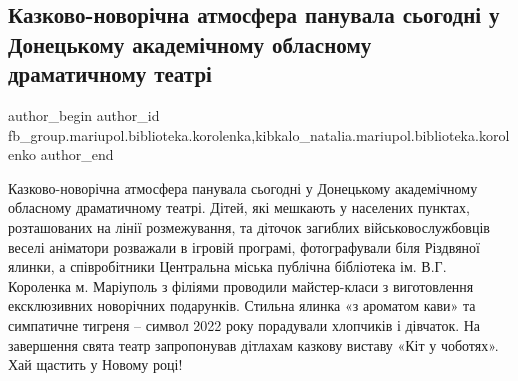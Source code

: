  
 
 
 
 

\subsection{Казково-новорічна атмосфера панувала сьогодні у Донецькому академічному обласному драматичному театрі}
\label{sec:23_12_2021.fb.fb_group.mariupol.biblioteka.korolenka.1.kazkovo_novor_chna_a}
 
\ifcmt
 author_begin
   author_id fb_group.mariupol.biblioteka.korolenka,kibkalo_natalia.mariupol.biblioteka.korolenko
 author_end
\fi

Казково-новорічна атмосфера панувала сьогодні у Донецькому академічному
обласному драматичному театрі.  Дітей, які мешкають у населених пунктах,
розташованих на лінії розмежування, та діточок загиблих військовослужбовців
веселі аніматори розважали в ігровій програмі, фотографували біля Різдвяної
ялинки, а співробітники Центральна міська публічна бібліотека ім. В.Г.
Короленка м. Маріуполь з філіями проводили майстер-класи з виготовлення
ексклюзивних новорічних подарунків. Стильна ялинка «з ароматом кави» та
симпатичне тигреня – символ 2022 року порадували хлопчиків і дівчаток. На
завершення свята театр запропонував дітлахам казкову виставу «Кіт у чоботях».
Хай щастить у Новому році!
